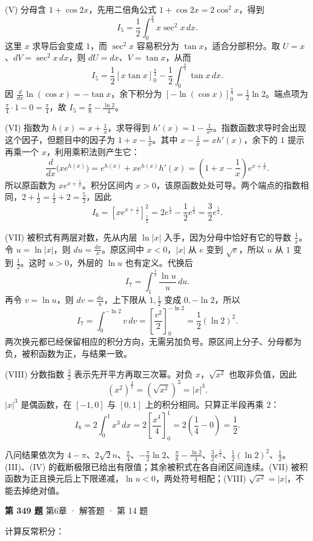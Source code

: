 \documentclass[UTF8,zihao=-4,fontset=fandol]{ctexart}
\newcommand{\Question}[3]{\fancyhead[L]{}
  \def\CurrentNumber{#1}\def\CurrentSource{#2}\def\CurrentDifficulty{#3}
  {\small\color{accent}\CurrentSection}\par
  {\Large\bfseries 第 #1 题}\hfill
  {\footnotesize\color{gray}{\ttfamily #3}\quad #2}\par\medskip
  \fontsize{13}{23}\selectfont}
\renewcommand{\Check}{\par\smallskip{\bfseries\color{accent}结论与检查}\par\nopagebreak}
\begin{document}
(V) 分母含 $1+\cos2x$，先用二倍角公式 $1+\cos2x=2\cos^2x$，得到
\[
I_5=\frac12\int_0^{\frac\pi4}x\sec^2x\,dx.
\]
这里 $x$ 求导后会变成 $1$，而 $\sec^2x$ 容易积分为 $\tan x$，适合分部积分。取 $U=x$、$dV=\sec^2x\,dx$，则 $dU=dx$、$V=\tan x$，从而
\[
I_5=\frac12[x\tan x]_0^{\frac\pi4}
-\frac12\int_0^{\frac\pi4}\tan x\,dx.
\]
因 $\frac{d}{dx}\ln(\cos x)=-\tan x$，余下积分为 $[-\ln(\cos x)]_0^{\frac\pi4}=\frac12\ln2$。端点项为 $\frac\pi4\cdot1-0=\frac\pi4$，故 $I_5=\frac\pi8-\frac{\ln2}{4}$。

(VI) 指数为 $h(x)=x+\frac1x$，求导得到 $h'(x)=1-\frac1{x^2}$。指数函数求导时会出现这个因子，但题目中的因子为 $1+x-\frac1x$。其中 $x-\frac1x=xh'(x)$，余下的 $1$ 提示再乘一个 $x$，利用乘积法则产生它：
\[
\frac{d}{dx}\bigl(xe^{h(x)}\bigr)
=e^{h(x)}+xe^{h(x)}h'(x)
=\left(1+x-\frac1x\right)e^{x+\frac1x}.
\]
所以原函数为 $xe^{x+\frac1x}$。积分区间内 $x>0$，该原函数处处可导。两个端点的指数相同，$2+\frac12=\frac12+2=\frac52$，因此
\[
I_6=\left[xe^{x+\frac1x}\right]_{\frac12}^2
=2e^{\frac52}-\frac12e^{\frac52}
=\frac32e^{\frac52}.
\]

(VII) 被积式有两层对数，先从内层 $\ln|x|$ 入手，因为分母中恰好有它的导数 $\frac1x$。令 $u=\ln|x|$，则 $du=\frac{dx}{x}$。原区间中 $x<0$，$|x|$ 从 $e$ 变到 $\sqrt e$，所以 $u$ 从 $1$ 变到 $\frac12$。这时 $u>0$，外层的 $\ln u$ 也有定义。代换后
\[
I_7=\int_1^{\frac12}\frac{\ln u}{u}\,du.
\]
再令 $v=\ln u$，则 $dv=\frac{du}{u}$，上下限从 $1,\frac12$ 变成 $0,-\ln2$，所以
\[
I_7=\int_0^{-\ln2}v\,dv
=\left[\frac{v^2}{2}\right]_0^{-\ln2}
=\frac12(\ln2)^2.
\]
两次换元都已经保留相应的积分方向，无需另加负号。原区间上分子、分母都为负，被积函数为正，与结果一致。

(VIII) 分数指数 $\frac32$ 表示先开平方再取三次幂。对负 $x$，$\sqrt{x^2}$ 也取非负值，因此
\[
(x^2)^{\frac32}=(\sqrt{x^2})^3=|x|^3.
\]
$|x|^3$ 是偶函数，在 $[-1,0]$ 与 $[0,1]$ 上的积分相同。只算正半段再乘 $2$：
\[
I_8=2\int_0^1x^3\,dx
=2\left[\frac{x^4}{4}\right]_0^1
=2\left(\frac14-0\right)=\frac12.
\]
\Check
八问结果依次为 $4-\pi$、$2\sqrt2n$、$\frac\pi4$、$-\frac\pi2\ln2$、$\frac\pi8-\frac{\ln2}4$、$\frac32e^{\frac52}$、$\frac12(\ln2)^2$、$\frac12$。(III)、(IV) 的截断极限已给出有限值；其余被积式在各自闭区间连续。(VII) 被积函数为正且换元后上下限递减，$\ln u<0$，两处符号相配；(VIII) $\sqrt{x^2}=|x|$，不能去掉绝对值。

\clearpage


\Question{349}{第6章 · 解答题 · 第 14 题}{***}

计算反常积分：
\end{document}
